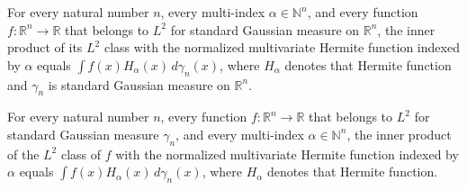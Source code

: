 \begin{lemma}
\label{BooleanAnalysis.GaussianSpace.inner_hermiteL2_toLp}
\leanok
{}
For every natural number $n$, every multi-index $\alpha\in\mathbb N^n$, and every
function $f:\mathbb R^n\to\mathbb R$ that belongs to $L^2$ for standard Gaussian measure
on $\mathbb R^n$, the inner product of its $L^2$ class with the normalized multivariate
Hermite function indexed by $\alpha$ equals $\int f(x)H_\alpha(x)\,d\gamma_n(x)$, where
$H_\alpha$ denotes that Hermite function and $\gamma_n$ is standard Gaussian measure on
$\mathbb R^n$.
\end{lemma}

\begin{lemma}
\label{BooleanAnalysis.GaussianSpace.inner_toLp_hermiteL2}
\leanok
{}
For every natural number $n$, every function $f:\mathbb R^n\to\mathbb R$ that belongs to
$L^2$ for standard Gaussian measure $\gamma_n$, and every multi-index $\alpha\in\mathbb
N^n$, the inner product of the $L^2$ class of $f$ with the normalized multivariate
Hermite function indexed by $\alpha$ equals $\int f(x)H_\alpha(x)\,d\gamma_n(x)$, where
$H_\alpha$ denotes that Hermite function.
\end{lemma}

